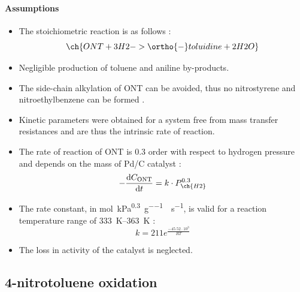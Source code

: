\paragraph{Assumptions}
\begin{itemize}
    \item The stoichiometric reaction is as follows \cite{zhao_new_2016}:
    \begin{equation}
        \ch{ONT +  3 H2 -> \ortho{-}toluidine + 2 H2O}
    \end{equation}
    \item Negligible production of toluene and aniline by-products.  
    \item The side-chain alkylation of ONT can be avoided, thus no nitrostyrene and nitroethylbenzene can be formed \cite{zhao_new_2016}.
    \item Kinetic parameters were obtained for a system free from mass transfer resistances and are thus the intrinsic rate of reaction.
    \item The rate of reaction of ONT is 0.3 order with respect to hydrogen pressure and depends on the mass of Pd/C catalyst \cite{rajadhyaksha_solvent_1986}:
    \begin{equation}
    - \frac{\dd C_\mathrm{ONT}}{\dd t}=k \cdot P_{\ch{H2}}^{0.3} 
    \end{equation}
    \item The rate constant, in \si{\mol\per\kPa\tothe{0.3}\per\g{}\per\s}, is valid for a reaction temperature range of \SIrange{333}{363}{\K} \cite{rajadhyaksha_solvent_1986}:
    \begin{equation}
        k=211e^{\frac{-45.52\cdot 10^{3}}{RT}}
        \label{eqn:ONT_k}
    \end{equation}
    \item The loss in activity of the catalyst is neglected.
\end{itemize}

\subsection{4-nitrotoluene oxidation}
